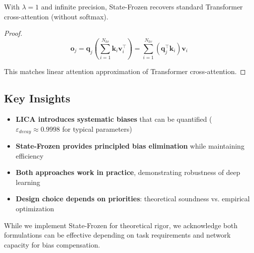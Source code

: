 \begin{theorem}
With $\lambda = 1$ and infinite precision, State-Frozen recovers standard Transformer cross-attention (without softmax).
\end{theorem}

\begin{proof}
$$\mathbf{o}_j = \mathbf{q}_j \left(\sum_{i=1}^{N_{kv}} \mathbf{k}_i \mathbf{v}_i^\top \right) = \sum_{i=1}^{N_{kv}} (\mathbf{q}_j^\top \mathbf{k}_i) \mathbf{v}_i$$

This matches linear attention approximation of Transformer cross-attention.
\end{proof}

\subsection{Key Insights}

\begin{itemize}
    \item \textbf{LICA introduces systematic biases} that can be quantified ($\varepsilon_{decay} \approx 0.9998$ for typical parameters)
    \item \textbf{State-Frozen provides principled bias elimination} while maintaining efficiency
    \item \textbf{Both approaches work in practice}, demonstrating robustness of deep learning
    \item \textbf{Design choice depends on priorities}: theoretical soundness vs. empirical optimization
\end{itemize}

While we implement State-Frozen for theoretical rigor, we acknowledge both formulations can be effective depending on task requirements and network capacity for bias compensation.
